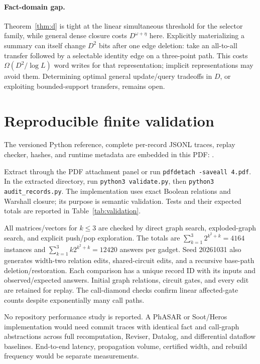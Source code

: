 \documentclass[11pt,letterpaper]{article}
\theoremstyle{definition}
\begin{document}
\paragraph{Fact-domain gap.}
Theorem~\ref{thm:d} is tight at the linear simultaneous threshold for
the selector family, while general dense closure costs
$D^{\omega+\eta}$ here. Explicitly materializing a summary can itself
change $D^2$ bits after one edge deletion: take an all-to-all transfer
followed by a selectable identity edge on a three-point path. This costs
$\Omega(D^2/\log L)$ word writes for that representation; implicit
representations may avoid them. Determining optimal general update/query
tradeoffs in $D$, or exploiting bounded-support transfers, remains open.

\section{Reproducible finite validation}\label{sec:validation}
The versioned Python reference, complete per-record JSONL traces, replay
checker, hashes, and runtime metadata are embedded in this PDF:
.\par

Extract through the PDF attachment panel or run
\texttt{pdfdetach -saveall 4.pdf}. In the extracted directory, run
\texttt{python3 validate.py}, then \texttt{python3 audit\_records.py}.
The implementation uses exact Boolean relations and Warshall closure;
its purpose is semantic validation. Tests and their expected totals are
reported in Table~\ref{tab:validation}.

All matrices/vectors for $k\le3$ are checked by direct graph search,
exploded-graph search, and explicit push/pop exploration. The totals are
$\sum_{k=1}^3 2^{k^2+k}=4164$ instances and
$\sum_{k=1}^3 k2^{k^2+k}=12420$ answers per gadget. Seed 20261031
also generates width-two relation edits, shared-circuit edits, and a
recursive base-path deletion/restoration. Each comparison has a unique
record ID with its inputs and observed/expected answers. Initial graph
relations, circuit gates, and every edit are retained for replay.
The call-diamond checks confirm linear affected-gate counts despite
exponentially many call paths.



No repository performance study is reported. A PhASAR \cite{SHB19} or
Soot/Heros implementation would need commit traces with identical fact and
call-graph abstractions across full recomputation, Reviser, Datalog, and
differential dataflow baselines. End-to-end latency, propagation volume,
certified width, and rebuild frequency would be separate measurements.
\end{document}
